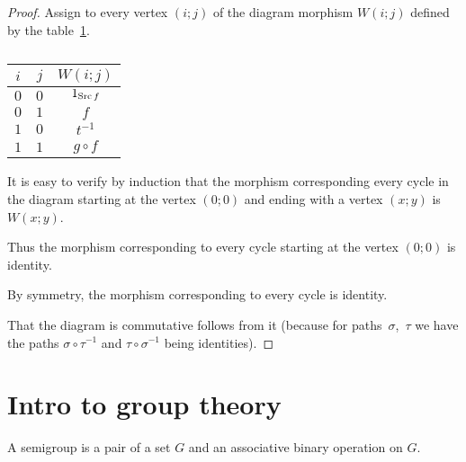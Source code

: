 \begin{proof}
Assign to every vertex $(i;j)$ of the diagram morphism $W(i;j)$
defined by the table~\ref{square-table}.

\begin{table}[h]
\caption{\label{square-table}}


\begin{tabular}{|c|c|c|}
\hline 
$i$ & $j$ & $W(i;j)$\tabularnewline
\hline 
\hline 
$0$ & $0$ & $1_{\operatorname{Src} f}$\tabularnewline
\hline 
$0$ & $1$ & $f$\tabularnewline
\hline 
$1$ & $0$ & $t^{-1}$\tabularnewline
\hline 
$1$ & $1$ & $g\circ f$\tabularnewline
\hline 
\end{tabular}
\end{table}


It is easy to verify by induction that the morphism corresponding
every cycle in the diagram starting at the vertex $(0;0)$ and ending
with a vertex $(x;y)$ is $W(x;y)$.

Thus the morphism corresponding to every cycle starting at the vertex
$(0;0)$ is identity.

By symmetry, the morphism corresponding to every cycle is identity.

That the diagram is commutative follows from it (because for paths~$\sigma$,~$\tau$
we have the paths $\sigma\circ\tau^{-1}$ and $\tau\circ\sigma^{-1}$
being identities).
\end{proof}

\section{Intro to group theory}
\begin{defn}
A semigroup is a pair of a set $G$ and an associative
binary operation on $G$.
\end{defn}

